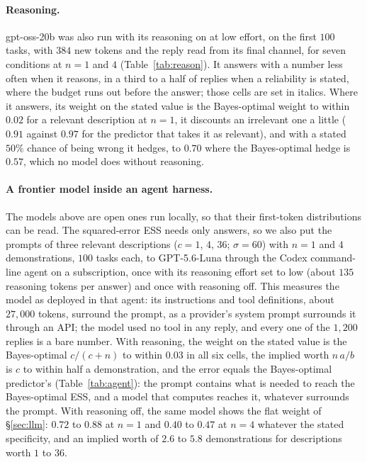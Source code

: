 \documentclass{article}
\begin{document}
\paragraph{Reasoning.} gpt-oss-20b was also run with its reasoning on at low effort, on the first $100$ tasks, with $384$ new tokens and the reply read from its final channel, for seven conditions at $n = 1$ and $4$ (Table~\ref{tab:reason}). It answers with a number less often when it reasons, in a third to a half of replies when a reliability is stated, where the budget runs out before the answer; those cells are set in italics. Where it answers, its weight on the stated value is the Bayes-optimal weight to within $0.02$ for a relevant description at $n = 1$, it discounts an irrelevant one a little ($0.91$ against $0.97$ for the predictor that takes it as relevant), and with a stated $50\%$ chance of being wrong it hedges, to $0.70$ where the Bayes-optimal hedge is $0.57$, which no model does without reasoning.

\begin{table}[!htb]
\centering\small
\caption{\textbf{With reasoning, gpt-oss-20b puts the Bayes-optimal weight on the stated value.} Low reasoning effort, $100$ tasks, $\sigma = 60$. Number: the fraction of replies that are a number. Weight and error: the model's against the Bayes-optimal predictor's, which hedges with the stated $p$ where one is given. Italics: fewer than three quarters of the replies are a number.}
\label{tab:reason}
\vspace{3pt}

\end{table}

\paragraph{A frontier model inside an agent harness.} The models above are open ones run locally, so that their first-token distributions can be read. The squared-error ESS needs only answers, so we also put the prompts of three relevant descriptions ($c = 1$, $4$, $36$; $\sigma = 60$) with $n = 1$ and $4$ demonstrations, $100$ tasks each, to GPT-5.6-Luna through the Codex command-line agent on a subscription, once with its reasoning effort set to low (about $135$ reasoning tokens per answer) and once with reasoning off. This measures the model as deployed in that agent: its instructions and tool definitions, about $27{,}000$ tokens, surround the prompt, as a provider's system prompt surrounds it through an API; the model used no tool in any reply, and every one of the $1{,}200$ replies is a bare number. With reasoning, the weight on the stated value is the Bayes-optimal $c/(c+n)$ to within $0.03$ in all six cells, the implied worth $n\,a/b$ is $c$ to within half a demonstration, and the error equals the Bayes-optimal predictor's (Table~\ref{tab:agent}): the prompt contains what is needed to reach the Bayes-optimal ESS, and a model that computes reaches it, whatever surrounds the prompt. With reasoning off, the same model shows the flat weight of \S\ref{sec:llm}: $0.72$ to $0.88$ at $n = 1$ and $0.40$ to $0.47$ at $n = 4$ whatever the stated specificity, and an implied worth of $2.6$ to $5.8$ demonstrations for descriptions worth $1$ to $36$.
\end{document}
